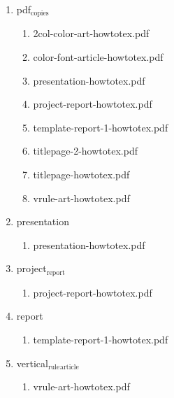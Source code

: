 \documentclass[11pt]{article}
\begin{document}
\begin{enumerate}
\begin{enumerate}
\item pdf$_{\text{copies}}$
\label{sec-1-1-1-1-46-9-18-11}
\begin{enumerate}
\item 2col-color-art-howtotex.pdf
\label{sec-1-1-1-1-46-9-18-11-1}

\item color-font-article-howtotex.pdf
\label{sec-1-1-1-1-46-9-18-11-2}

\item presentation-howtotex.pdf
\label{sec-1-1-1-1-46-9-18-11-3}

\item project-report-howtotex.pdf
\label{sec-1-1-1-1-46-9-18-11-4}

\item template-report-1-howtotex.pdf
\label{sec-1-1-1-1-46-9-18-11-5}

\item titlepage-2-howtotex.pdf
\label{sec-1-1-1-1-46-9-18-11-6}

\item titlepage-howtotex.pdf
\label{sec-1-1-1-1-46-9-18-11-7}

\item vrule-art-howtotex.pdf
\label{sec-1-1-1-1-46-9-18-11-8}
\end{enumerate}

\item presentation
\label{sec-1-1-1-1-46-9-18-12}
\begin{enumerate}
\item presentation-howtotex.pdf
\label{sec-1-1-1-1-46-9-18-12-1}
\end{enumerate}

\item project$_{\text{report}}$
\label{sec-1-1-1-1-46-9-18-13}
\begin{enumerate}
\item project-report-howtotex.pdf
\label{sec-1-1-1-1-46-9-18-13-1}
\end{enumerate}

\item report
\label{sec-1-1-1-1-46-9-18-14}
\begin{enumerate}
\item template-report-1-howtotex.pdf
\label{sec-1-1-1-1-46-9-18-14-1}
\end{enumerate}

\item vertical$_{\text{rule}}$$_{\text{article}}$
\label{sec-1-1-1-1-46-9-18-15}
\begin{enumerate}
\item vrule-art-howtotex.pdf
\label{sec-1-1-1-1-46-9-18-15-1}
\end{enumerate}
\end{enumerate}


\end{enumerate}
\end{document}
